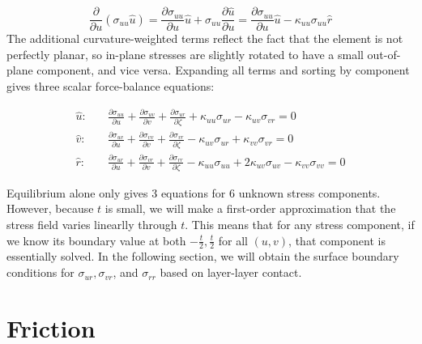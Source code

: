 \documentclass[11pt]{article}
\begin{document}
\begin{equation}
    \frac{\partial}{\partial u} (\sigma_{uu} \hat u) = \frac{\partial \sigma_{uu}}{\partial u}\hat u + \sigma_{uu}\frac{\partial \hat u}{\partial u} 
    = \frac{\partial \sigma_{uu}}{\partial u}\hat u - \kappa_{uu}\sigma_{uu}\hat r
\end{equation}
The additional curvature-weighted terms reflect the fact that the element is not perfectly planar, so in-plane stresses are slightly rotated to have a small out-of-plane component, and vice versa. Expanding all terms and sorting by component gives three scalar force-balance equations:

\begin{align}
    \hat u:\quad &\boxed{\frac{\partial\sigma_{uu}}{\partial u}+\frac{\partial\sigma_{uv}}{\partial v}+\frac{\partial\sigma_{ur}}{\partial\zeta} + \kappa_{uu}\sigma_{ur} - \kappa_{uv}\sigma_{vr} = 0} \label{eq:inplane_u_full}\\
    \hat v:\quad &\boxed{\frac{\partial\sigma_{uv}}{\partial u}+\frac{\partial\sigma_{vv}}{\partial v}+\frac{\partial\sigma_{vr}}{\partial\zeta} - \kappa_{uv}\sigma_{ur} + \kappa_{vv}\sigma_{vr} = 0} \label{eq:inplane_v_full}\\
    \hat r:\quad &\boxed{\frac{\partial\sigma_{ur}}{\partial u}+\frac{\partial\sigma_{vr}}{\partial v}+\frac{\partial\sigma_{rr}}{\partial\zeta} - \kappa_{uu}\sigma_{uu}+2\kappa_{uv}\sigma_{uv}-\kappa_{vv}\sigma_{vv} = 0} \label{eq:outofplane_r_full}
\end{align}

Equilibrium alone only gives 3 equations for 6 unknown stress components. However, because $t$ is small, we will make a first-order approximation that the stress field varies linearlly through $t$. This means that for any stress component, if we know its boundary value at both $-\frac{t}{2}, \frac{t}{2}$ for all $(u,v)$, that component is essentially solved. In the following section, we will obtain the surface boundary conditions for $\sigma_{ur}, \sigma_{vr}$, and $\sigma_{rr}$ based on layer-layer contact.


\section{Friction}\label{sec:friction}
\end{document}
